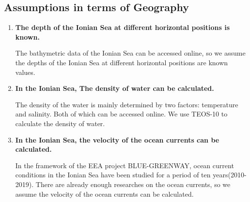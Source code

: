 \documentclass[12pt]{article}
\begin{document}
\subsection{Assumptions in terms of Geography}
\begin{enumerate}
	\item \textbf{The depth of the Ionian Sea at different horizontal positions is known.}
 
	The bathymetric data of the Ionian Sea can be accessed online, so we assume the depths of the Ionian Sea at different horizontal positions are known values.
	\item \textbf{In the Ionian Sea, The density of water can be calculated.}
 
	The density of the water is mainly determined by two factors: temperature and salinity. Both of which can be accessed online. We use TEOS-10\cite{TEOS-10} to calculate the density of water.
    \item \textbf{In the Ionian Sea, the velocity of the ocean currents can be calculated.}\cite{Ionian Sea Research,Blue-greenway}
    
    In the framework of the EEA project BLUE-GREENWAY, ocean current conditions in the Ionian Sea have been studied for a period of ten years(2010-2019). There are already enough researches on the ocean currents, so we assume the velocity of the ocean currents can be calculated.
\end{enumerate}
\end{document}
